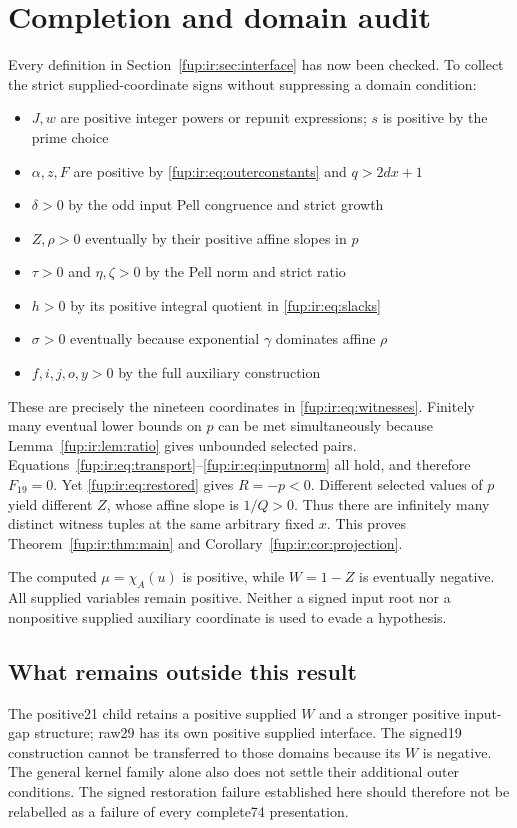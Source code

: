 \documentclass[11pt,letterpaper]{article}
\theoremstyle{definition}\newtheorem{definition}[theorem]{Definition}
\theoremstyle{remark}\newtheorem{remark}[theorem]{Remark}
\begin{document}
\section{Completion and domain audit}\label{fup:ir:sec:conclusion}
Every definition in Section~\ref{fup:ir:sec:interface} has now been checked. To collect the strict supplied-coordinate signs without suppressing a domain condition:
\begin{itemize}[leftmargin=1.5em]
 \item $J,w$ are positive integer powers or repunit expressions; $s$ is positive by the prime choice
 \item $\alpha,z,F$ are positive by \eqref{fup:ir:eq:outerconstants} and $q>2dx+1$
 \item $\delta>0$ by the odd input Pell congruence and strict growth
 \item $Z,\rho>0$ eventually by their positive affine slopes in $p$
 \item $\tau>0$ and $\eta,\zeta>0$ by the Pell norm and strict ratio
 \item $h>0$ by its positive integral quotient in \eqref{fup:ir:eq:slacks}
 \item $\sigma>0$ eventually because exponential $\gamma$ dominates affine $\rho$
 \item $f,i,j,o,y>0$ by the full auxiliary construction
\end{itemize}
These are precisely the nineteen coordinates in \eqref{fup:ir:eq:witnesses}. Finitely many eventual lower bounds on $p$ can be met simultaneously because Lemma~\ref{fup:ir:lem:ratio} gives unbounded selected pairs. Equations~\eqref{fup:ir:eq:transport}--\eqref{fup:ir:eq:inputnorm} all hold, and therefore $F_{19}=0$. Yet \eqref{fup:ir:eq:restored} gives $R=-p<0$. Different selected values of $p$ yield different $Z$, whose affine slope is $1/Q>0$. Thus there are infinitely many distinct witness tuples at the same arbitrary fixed $x$. This proves Theorem~\ref{fup:ir:thm:main} and Corollary~\ref{fup:ir:cor:projection}.

The computed $\mu=\chi_A(u)$ is positive, while $W=1-Z$ is eventually negative. All supplied variables remain positive. Neither a signed input root nor a nonpositive supplied auxiliary coordinate is used to evade a hypothesis.

\subsection{What remains outside this result}
The positive21 child retains a positive supplied $W$ and a stronger positive input-gap structure; raw29 has its own positive supplied interface. The signed19 construction cannot be transferred to those domains because its $W$ is negative. The general kernel family alone also does not settle their additional outer conditions. The signed restoration failure established here should therefore not be relabelled as a failure of every complete74 presentation.
\end{document}
